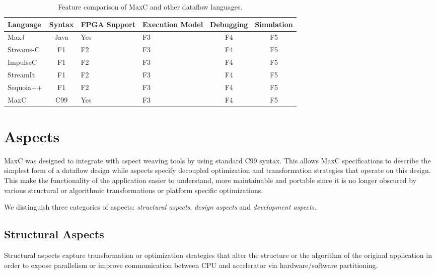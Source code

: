 \begin{table}[!h]
  \renewcommand{\arraystretch}{1.3}
  \centering
  \caption{Feature comparison of MaxC and other dataflow languages.}
  \label{table:feature-comparison}
  \begin{tabular}{ l | c |  p{1cm} |  p{1cm} |  c |  c }
    Language  & Syntax & FPGA Support & Execution Model & Debugging & Simulation \\ \hline
    MaxJ      & Java   & Yes          & F3              & F4        & F5         \\
    Streams-C & F1     & F2           & F3              & F4        & F5         \\
    ImpulseC  & F1     & F2           & F3              & F4        & F5         \\
    StreamIt  & F1     & F2           & F3              & F4        & F5         \\
    Sequoia++ & F1     & F2           & F3              & F4        & F5         \\
    MaxC      & C99    & Yes          & F3              & F4        & F5         \\
  \end{tabular}
\end{table}

\section{Aspects}

MaxC was designed to integrate with aspect weaving tools by using
standard C99 syntax. This allows MaxC specifications to describe the
simplest form of a dataflow design while aspects specify decoupled
optimization and transformation strategies that operate on this
design. This make the functionality of the application easier to
understand, more maintainable and portable since it is no longer
obscured by various structural or algorithmic transformations or
platform specific optimizations.

We distinguish three categories of aspects: \emph{structural aspects},
\emph{design aspects} and \emph{development aspects}.

\subsection{Structural Aspects}

Structural aspects capture transformation or optimization strategies
that alter the structure or the algorithm of the original application
in order to expose parallelism or improve communication between CPU
and accelerator via hardware/software partitioning.

